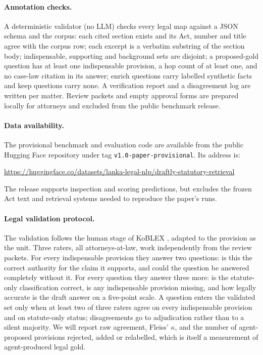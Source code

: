 \documentclass{article}
\begin{document}
\paragraph{Annotation checks.} A deterministic validator (no LLM) checks every
legal map against a JSON schema and the corpus: each cited section exists and
its Act, number and title agree with the corpus row; each excerpt is a
verbatim substring of the section body; indispensable, supporting and
background sets are disjoint; a proposed-gold question has at least one
indispensable provision, a hop count of at least one, and no case-law
citation in its answer; enrich questions carry labelled synthetic facts and
keep questions carry none. A verification report and a disagreement log are
written per matter. Review packets and empty approval forms are prepared
locally for attorneys and excluded from the public benchmark release.

\paragraph{Data availability.} The provisional benchmark and evaluation code
are available from the public Hugging Face repository under tag
\texttt{v1.0-paper-provisional}. Its address is:
\par\noindent
\url{https://huggingface.co/datasets/lanka-legal-nlp/draftly-statutory-retrieval}
\par\noindent
The release supports inspection and scoring predictions, but excludes the
frozen Act text and retrieval systems needed to reproduce the paper's runs.

\paragraph{Legal validation protocol.} The validation follows the human stage
of KoBLEX \citep{lee2025koblex}, adapted to the provision as the unit. Three
raters, all attorneys-at-law, work independently from the review packets. For
every indispensable provision they answer two questions: is this the correct
authority for the claim it supports, and could the question be answered
completely without it. For every question they answer three more: is the
statute-only classification correct, is any indispensable provision missing,
and how legally accurate is the draft answer on a five-point scale. A question
enters the validated set only when at least two of three raters agree on every
indispensable provision and on statute-only status; disagreements go to
adjudication rather than to a silent majority. We will report raw agreement,
Fleiss' $\kappa$, and the number of agent-proposed provisions rejected, added
or relabelled, which is itself a measurement of agent-produced legal gold.
\end{document}
